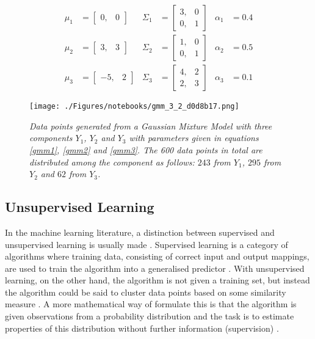 \begin{align}
  \mu_1 &= \left[
    \begin{array}{cc}
      0, & 0
    \end{array}
    \right] 
  &
  \Sigma_1 &= 
  \left[
  \begin{array}{cc}
    3, & 0 \\
    0, & 1 
  \end{array}
  \right] 
  &
  \alpha_1 &= 0.4 \label{gmm1}
  \\
  \mu_2 &= \left[
    \begin{array}{cc}
      3, & 3
    \end{array}
    \right] 
  &
  \Sigma_2 &= 
  \left[
  \begin{array}{cc}
    1, & 0 \\
    0, & 1 
  \end{array}
  \right]   
  &
  \alpha_2 &= 0.5 \label{gmm2}
\\
  \mu_3 &= \left[
    \begin{array}{cc}
      -5, & 2
    \end{array}
    \right] 
  &
  \Sigma_3 &= 
  \left[
  \begin{array}{cc}
    4, & 2 \\
    2, & 3 
  \end{array}
  \right]
  &
  \alpha_3 &= 0.1 \label{gmm3}
\end{align}

\begin{figure}[h!t]
  \begin{minipage}[b]{\linewidth}
    \centering
    \texttt{[image: ./Figures/notebooks/gmm\_3\_2\_d0d8b17.png]}
    \caption{\small{\emph{Data points generated from a Gaussian Mixture Model with three components $Y_1$, $Y_2$ and $Y_3$ with parameters given in equations \ref{gmm1}, \ref{gmm2} and \ref{gmm3}. The 600 data points in total are distributed among the component as follows: $243$ from $Y_1$, $295$ from $Y_2$ and $62$ from $Y_3$.}}}
    \label{fig:gmm_3_2}
  \end{minipage}
\end{figure}

\subsection{Unsupervised Learning}
In the machine learning literature, a distinction between supervised and unsupervised learning is usually made \parencite{Marsland2009,Hastie2001}. Supervised learning is a category of algorithms where training data, consisting of correct input and output mappings, are used to train the algorithm into a generalised predictor \parencite{Hastie2001}. With unsupervised learning, on the other hand, the algorithm is not given a training set, but instead the algorithm could be said to cluster data points based on some similarity measure \parencite{Marsland2009}. A more mathematical way of formulate this is that the algorithm is given observations from a probability distribution and the task is to estimate properties of this distribution without further information (supervision) \parencite{Hastie2001}.

